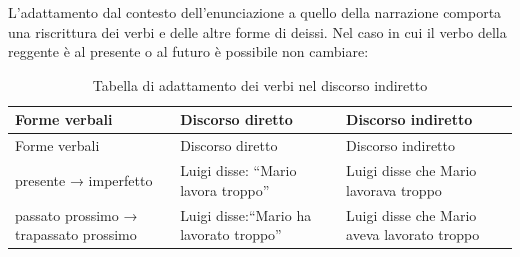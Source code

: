 \documentclass[
  a4paper,
  twoside,
  11pt,
  chapterprefix=false,
  bibliography=totocnumbered,
  listof=flat]{scrbook}
\begin{document}
L'adattamento dal contesto dell'enunciazione a quello della narrazione comporta una riscrittura dei verbi e delle altre forme di deissi. Nel caso in cui il verbo della reggente è al presente o al futuro è possibile non cambiare:

\begin{longtable}[]{@{}lll@{}}
\caption{Tabella di adattamento dei verbi nel discorso indiretto}\tabularnewline
\toprule
\begin{minipage}[b]{0.28\columnwidth}\raggedright
Forme verbali\strut
\end{minipage} & \begin{minipage}[b]{0.31\columnwidth}\raggedright
Discorso diretto\strut
\end{minipage} & \begin{minipage}[b]{0.32\columnwidth}\raggedright
Discorso indiretto\strut
\end{minipage}\tabularnewline
\midrule
\endfirsthead
\toprule
\begin{minipage}[b]{0.28\columnwidth}\raggedright
Forme verbali\strut
\end{minipage} & \begin{minipage}[b]{0.31\columnwidth}\raggedright
Discorso diretto\strut
\end{minipage} & \begin{minipage}[b]{0.32\columnwidth}\raggedright
Discorso indiretto\strut
\end{minipage}\tabularnewline
\midrule
\endhead
\begin{minipage}[t]{0.28\columnwidth}\raggedright
presente → imperfetto\strut
\end{minipage} & \begin{minipage}[t]{0.31\columnwidth}\raggedright
Luigi disse: \enquote{Mario lavora troppo}\strut
\end{minipage} & \begin{minipage}[t]{0.32\columnwidth}\raggedright
Luigi disse che Mario lavorava troppo\strut
\end{minipage}\tabularnewline
\begin{minipage}[t]{0.28\columnwidth}\raggedright
passato prossimo → trapassato prossimo\strut
\end{minipage} & \begin{minipage}[t]{0.31\columnwidth}\raggedright
Luigi disse:\enquote{Mario ha lavorato troppo}\strut
\end{minipage} & \begin{minipage}[t]{0.32\columnwidth}\raggedright
Luigi disse che Mario aveva lavorato troppo\strut

\end{minipage}
\end{longtable}
\end{document}
